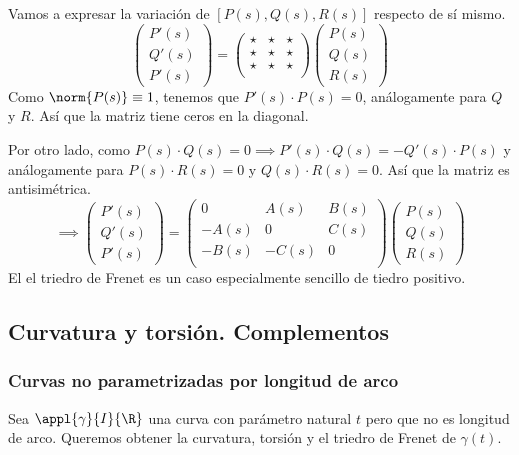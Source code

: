 Vamos a expresar la variación de $[P(s), Q(s), R(s)]$ respecto de sí mismo.
\[\begin{pmatrix}
		P'(s) \\ Q'(s) \\ P'(s)
	\end{pmatrix} = \begin{pmatrix}
		\star & \star & \star \\
		\star & \star & \star \\
		\star & \star & \star \\
	\end{pmatrix}\begin{pmatrix}
		P(s) \\ Q(s) \\ R(s)
	\end{pmatrix}\]
Como $\norm{P(s)}\equiv1$, tenemos que $P'(s)\cdot P(s)=0$, análogamente para $Q$ y $R$. Así que la matriz tiene ceros en la diagonal.

Por otro lado, como $P(s)\cdot Q(s)=0 \implies P'(s)\cdot Q(s)=-Q'(s)\cdot P(s)$ y análogamente para $P(s)\cdot R(s)=0$ y $Q(s)\cdot R(s)=0$. Así que la matriz es antisimétrica.
\[\implies \begin{pmatrix}
		P'(s) \\ Q'(s) \\ P'(s)
	\end{pmatrix} = \begin{pmatrix}
		0     & A(s)  & B(s) \\
		-A(s) & 0     & C(s) \\
		-B(s) & -C(s) & 0    \\
	\end{pmatrix}\begin{pmatrix}
		P(s) \\ Q(s) \\ R(s)
	\end{pmatrix}\]
El el triedro de Frenet es un caso especialmente sencillo de tiedro positivo.

\subsection{Curvatura y torsión. Complementos}
\subsubsection{Curvas no parametrizadas por longitud de arco}
Sea $\appl{\gamma}{I}{\R}$ una curva con parámetro natural $t$ pero que no es longitud de arco. Queremos obtener la curvatura, torsión y el triedro de Frenet de $\gamma(t)$.

